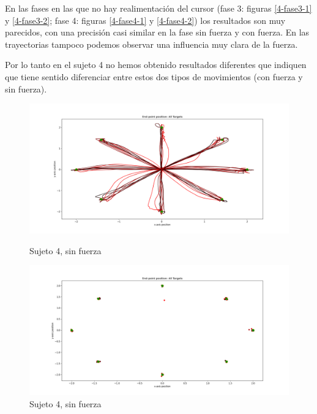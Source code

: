 \documentclass[a4paper,11pt, oneside]{book}
\begin{document}
En las fases en las que no hay realimentación del cursor (fase 3: figuras \ref{4-fase3-1} y \ref{4-fase3-2}; fase 4: figuras \ref{4-fase4-1} y \ref{4-fase4-2}) los resultados son muy parecidos, con una precisión casi similar en la fase sin fuerza y con fuerza. En las trayectorias tampoco podemos observar una influencia muy clara de la fuerza.

Por lo tanto en el sujeto 4 no hemos obtenido resultados diferentes que indiquen que tiene sentido diferenciar entre estos dos tipos de movimientos (con fuerza y sin fuerza).

\begin{figure}[H]
	\begin{minipage}[b]{0.5\linewidth}
		\centering
		\includegraphics[width=\linewidth]{sujeto4/no_force/trayectorias}
		\caption{Sujeto 4, sin fuerza}
		\label{4-fase1-1}
	\end{minipage}
	\hspace{0.5cm}
	\begin{minipage}[b]{0.5\linewidth}
		\centering
		\includegraphics[width=\linewidth]{sujeto4/no_force/trayectorias_puntos}
		\caption{Sujeto 4, sin fuerza}
		\label{4-fase1-2}
	\end{minipage}
\end{figure}
\end{document}

